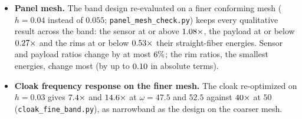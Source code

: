 \begin{itemize}[itemsep=1pt]
\item \textbf{Panel mesh.} The band design re-evaluated on a finer conforming mesh
  ($h=0.04$ instead of $0.055$; \texttt{panel\_\allowbreak mesh\_\allowbreak check.py}) keeps every
  qualitative result across the band: the sensor at or above $1.08\times$, the
  payload at or below $0.27\times$ and the rims at or below $0.53\times$
  their straight-fiber energies. Sensor and payload ratios change by at most
  $6\%$; the rim ratios, the smallest energies, change most (by up to
  $0.10$ in absolute terms).
\item \textbf{Cloak frequency response on the finer mesh.} The cloak re-optimized on $h=0.03$
  gives $7.4\times$ and $14.6\times$ at $\omega=47.5$ and $52.5$
  against $40\times$ at $50$ (\texttt{cloak\_\allowbreak fine\_\allowbreak band.py}),
  as narrowband as the design on the coarser mesh.
\end{itemize}
\begin{table}[!tbp]
\centering\footnotesize
\caption{Numerical verification of the lens (fixed optimized design).}\label{tab:verify}
\end{table}

